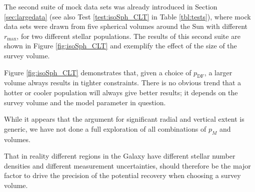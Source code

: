 \documentclass[iop,revtex4,numberedappendix,appendixfloats]{emulateapj}
\newcommand{\pmodel}{\ensuremath{p_M}}
\begin{document}
The second suite of mock data sets was already introduced in Section \ref{sec:largedata} (see also Test \ref{test:isoSph_CLT} in Table \ref{tbl:tests}), where mock data sets were drawn from five spherical volumes around the Sun with different $r_\text{max}$, for two different stellar populations. The results of this second suite are shown in Figure \ref{fig:isoSph_CLT} and exemplify the effect of the size of the survey volume.

Figure \ref{fig:isoSph_CLT} demonstrates that, given a choice of $p_\text{DF}$, a larger volume always results in tighter constraints. There is no obvious trend that a hotter or cooler population will always give better results; it depends on the survey volume and the model parameter in question.

While it appears that the argument for significant radial and vertical extent is generic, we have not done a full exploration of all combinations of \pmodel{} and volumes.

That in reality different regions in the Galaxy have different stellar number densities and different measurement uncertainties, should therefore be the major factor to drive the precision of the potential recovery when choosing a survey volume.
\end{document}
